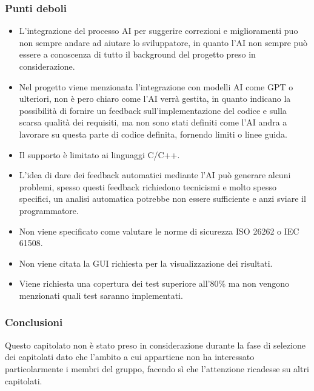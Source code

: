     \subsubsection{Punti deboli}
   \begin{itemize}
    \item L’integrazione del processo AI per suggerire correzioni e miglioramenti puo non sempre andare ad aiutare lo sviluppatore, in quanto l’AI non sempre può essere a conoscenza di tutto il background del progetto preso in considerazione.
    \item Nel progetto viene menzionata l’integrazione con modelli AI come GPT o ulteriori, non è pero chiaro come l’AI verrà gestita, in quanto indicano la possibilità di fornire un feedback sull’implementazione del codice e sulla scarsa qualità dei requisiti, ma non sono stati definiti come l’AI andra a lavorare su questa parte di codice definita, fornendo limiti o linee guida.
    \item Il supporto è limitato ai linguaggi C/C++.
    \item L’idea di  dare dei feedback automatici mediante l’AI può generare alcuni problemi, spesso questi feedback richiedono tecnicismi e molto spesso specifici, un analisi automatica potrebbe non essere sufficiente e anzi sviare il programmatore.
    \item Non viene specificato come valutare le norme di sicurezza  ISO 26262 o IEC 61508.
    \item Non viene citata la GUI richiesta per la visualizzazione dei risultati.
    \item  Viene richiesta una copertura dei test superiore all’80\% ma non vengono menzionati quali test saranno implementati.
\end{itemize}
    \subsubsection{Conclusioni}
   Questo capitolato non è stato preso in considerazione durante la fase di selezione dei capitolati dato che l’ambito a cui appartiene non ha interessato particolarmente i membri del gruppo, facendo sì che l’attenzione ricadesse su altri capitolati.
